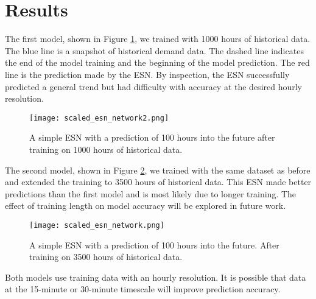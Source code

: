 \section{Results}
The first model, shown in Figure \ref{fig:ESN1}, we trained with 1000 hours of
historical data. The blue line is a snapshot of historical demand data. The
dashed line indicates the end of the model training and the beginning of the
model prediction. The red line is the prediction made by the \gls{ESN}. By
inspection, the \gls{ESN} successfully predicted a general
trend but had difficulty with accuracy at the desired hourly resolution.

\begin{figure}[h]
  \centering
  \texttt{[image: scaled\_esn\_network2.png]}
  \caption{A simple ESN with a prediction of 100 hours into the future after
  training on 1000 hours of historical data.}
  \label{fig:ESN1}
\end{figure}

The second model, shown in Figure \ref{fig:ESN2}, we trained with the same
dataset as before and extended the training to 3500 hours of
historical data. This \gls{ESN} made better predictions than the first model
and is most likely due to longer training. The effect of training
length on model accuracy will be explored in future work.

\begin{figure}[h]
  \centering
  \texttt{[image: scaled\_esn\_network.png]}
  \caption{A simple ESN with a prediction of 100 hours into the future. After
  training on 3500 hours of historical data.}
  \label{fig:ESN2}
\end{figure}

Both models use training data with an hourly resolution. It is possible
that data at the 15-minute or 30-minute timescale will improve prediction
accuracy.
